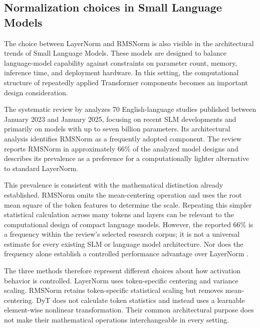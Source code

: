 \subsection{Normalization choices in Small Language Models}
\label{subsec:norm-small-language-models}

The choice between LayerNorm and RMSNorm is also visible in the
architectural trends of Small Language Models. These models are designed
to balance language-model capability against constraints on parameter
count, memory, inference time, and deployment hardware. In this setting,
the computational structure of repeatedly applied Transformer
components becomes an important design consideration.

The systematic review by \textcite{corradini2025slmreview} analyzes
70 English-language studies published between January 2023 and January
2025, focusing on recent SLM developments and primarily on models with
up to seven billion parameters. Its architectural analysis identifies
RMSNorm as a frequently adopted component. The review reports RMSNorm
in approximately \(66\%\) of the analyzed model designs and describes
its prevalence as a preference for a computationally lighter alternative
to standard LayerNorm.

This prevalence is consistent with the mathematical distinction already
established. RMSNorm omits the mean-centering operation and uses the
root mean square of the token features to determine the scale. Repeating
this simpler statistical calculation across many tokens and layers can
be relevant to the computational design of compact language models.
However, the reported \(66\%\) is a frequency within the review's
selected research corpus; it is not a universal estimate for every
existing SLM or language model architecture. Nor does the frequency
alone establish a controlled performance advantage over LayerNorm
\parencite{corradini2025slmreview}.

The three methods therefore represent different choices about how
activation behavior is controlled. LayerNorm uses token-specific
centering and variance scaling. RMSNorm retains token-specific
statistical scaling but removes mean-centering. DyT does not calculate
token statistics and instead uses a learnable element-wise nonlinear
transformation. Their common architectural purpose does not make their
mathematical operations interchangeable in every setting.

